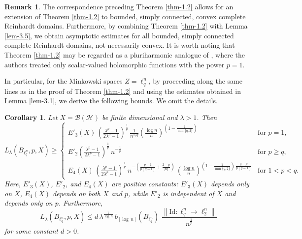 \documentclass[a4paper,11pt, reqno]{amsart}
\newtheorem{cor}{Corollary}[section]
\theoremstyle{definition}
\newtheorem{rem}{Remark}[section]
\newcommand{\norm}[1]{\left\lVert#1\right\rVert}
\begin{document}
\begin{rem}
	The correspondence preceding Theorem \ref{thm-1.2} allows for an extension of Theorem \ref{thm-1.2} to bounded, simply connected, convex complete Reinhardt domains. Furthermore, by combining Theorem \ref{thm-1.2} with Lemma \ref{lem-3.5}, we obtain asymptotic estimates for all bounded, simply connected complete Reinhardt domains, not necessarily convex. It is worth noting that Theorem \ref{thm-1.2} may be regarded as a pluriharmonic analogue of \cite[Proposition 3.2 and Theorem 3.3]{defant-2004}, where the authors treated only scalar-valued holomorphic functions with the power $p=1$.
\end{rem}
In particular, for the Minkowski spaces $Z=\ell^n _q$, by proceeding along the same lines as in the proof of Theorem \ref{thm-1.2} and using the estimates obtained in Lemma \ref{lem-3.1}, we derive the following bounds. We omit the details.
\begin{cor} \label{cor-1.4-snd}
	Let $X=\mathcal{B}(\mathcal{H})$ be finite dimensional and $\lambda>1$. Then
	\begin{equation*}
		L_{\lambda}(B_{\ell^n _q}, p,X) \geq	\begin{cases}
			E'_{3}(X)\,\left(\frac{\lambda^p -1}{2\lambda^p - 1}\right)^{\frac{1}{p}} \, \frac{1}{n^{1/q}} \left(\frac{\log n}{n}\right)^{ \left(1- \frac{1}{\min\{q,2\}}\right)} & \text{for $p=1$}, \\[2mm]
			E'_{2} \left(\frac{\lambda^p -1}{2\lambda^p - 1}\right)^{\frac{1}{p}}\, n^{-\frac{1}{p}} & \text{for $p \geq q$}, \\[2mm]
			
			E_{4}(X)\,  \left(\frac{\lambda^p -1}{2\lambda^p - 1}\right)^{\frac{1}{p}} \,n^{-\left(\frac{p-1}{p(q-1)} + \frac{2-p}{pq}\right)}\, \left( \frac{\log n}{n}\right)^{\left(1- \frac{1}{\min\{q,2\}}\right)\, \frac{q-p}{p(q-1)}} & \text{for $1<p< q$}. 
		\end{cases}
	\end{equation*}
	Here, $E'_{3}(X)$, $E'_{2}$, and $E_{4}(X)$ are positive constants: $E'_{3}(X)$ depends only on $X$, $E_{4}(X)$ depends on both $X$ and $p$, while $E'_{2}$ is independent of $X$ and depends only on $p$. Furthermore,
	\begin{equation*}
		L_{\lambda}(B_{\ell^n_q}, p,X) \leq d\,\lambda^{\frac{1}{\log \,n}}\,b_{[\log\,n]}(B_{\ell^n_q})\, \,\frac{\norm{\mathrm{Id}:\ell^n_q \rightarrow \ell^n_2}}{n^{\frac{1}{p}}}
	\end{equation*}
	for some constant $d>0$.
\end{cor}
\end{document}
